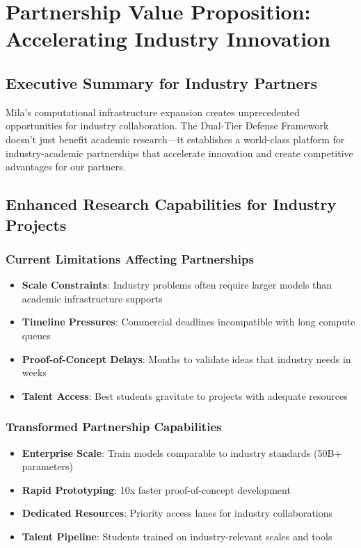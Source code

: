 \section{Partnership Value Proposition: Accelerating Industry Innovation}

\subsection{Executive Summary for Industry Partners}

Mila's computational infrastructure expansion creates unprecedented opportunities for industry collaboration. The Dual-Tier Defense Framework doesn't just benefit academic research---it establishes a world-class platform for industry-academic partnerships that accelerate innovation and create competitive advantages for our partners.

\subsection{Enhanced Research Capabilities for Industry Projects}

\subsubsection{Current Limitations Affecting Partnerships}
\begin{itemize}
\item \textbf{Scale Constraints}: Industry problems often require larger models than academic infrastructure supports
\item \textbf{Timeline Pressures}: Commercial deadlines incompatible with long compute queues
\item \textbf{Proof-of-Concept Delays}: Months to validate ideas that industry needs in weeks
\item \textbf{Talent Access}: Best students gravitate to projects with adequate resources
\end{itemize}

\subsubsection{Transformed Partnership Capabilities}
\begin{itemize}
\item \textbf{Enterprise Scale}: Train models comparable to industry standards (50B+ parameters)
\item \textbf{Rapid Prototyping}: 10x faster proof-of-concept development
\item \textbf{Dedicated Resources}: Priority access lanes for industry collaborations
\item \textbf{Talent Pipeline}: Students trained on industry-relevant scales and tools
\end{itemize}

